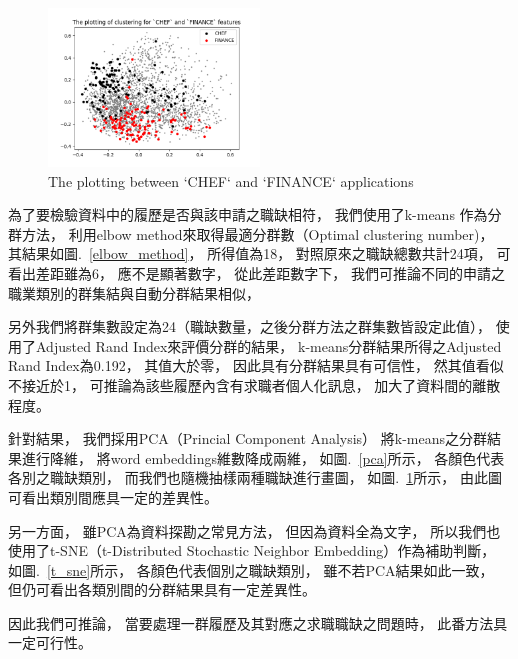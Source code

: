 \documentclass[sigconf]{acmart}
\begin{document}
\begin{figure}
    \centerline{\includegraphics[width=0.5\textwidth]{chef_finance_plotting.png}}
    \caption{The plotting between `CHEF` and `FINANCE` applications}
    \label{chef_finance_plotting}
\end{figure}


為了要檢驗資料中的履歷是否與該申請之職缺相符，
我們使用了k-means \cite{macqueen1967some}作為分群方法，
利用elbow method來取得最適分群數（Optimal clustering number)，
其結果如圖.~\ref{elbow_method}，
所得值為18，
對照原來之職缺總數共計24項，
可看出差距雖為6，
應不是顯著數字，
從此差距數字下，
我們可推論不同的申請之職業類別的群集結與自動分群結果相似，

另外我們將群集數設定為24（職缺數量，之後分群方法之群集數皆設定此值），
使用了Adjusted Rand Index來評價分群的結果\cite{hubert1985comparing}，
k-means分群結果所得之Adjusted Rand Index為0.192，
其值大於零，
因此具有分群結果具有可信性，
然其值看似不接近於1，
可推論為該些履歷內含有求職者個人化訊息，
加大了資料間的離散程度。

針對結果，
我們採用PCA（Princial Component Analysis）\cite{pearson1901liii} \cite{han2011data}將k-means之分群結果進行降維，
將word embeddings維數降成兩維，
如圖.~\ref{pca}所示，
各顏色代表各別之職缺類別，
而我們也隨機抽樣兩種職缺進行畫圖，
如圖.~\ref{chef_finance_plotting}所示，
由此圖可看出類別間應具一定的差異性。


另一方面，
雖PCA為資料探勘之常見方法，
但因為資料全為文字，
所以我們也使用了t-SNE（t-Distributed Stochastic Neighbor Embedding）\cite{van2008visualizing}作為補助判斷，
如圖.~\ref{t_sne}所示，
各顏色代表個別之職缺類別，
雖不若PCA結果如此一致，
但仍可看出各類別間的分群結果具有一定差異性。

因此我們可推論，
當要處理一群履歷及其對應之求職職缺之問題時，
此番方法具一定可行性。
\end{document}
